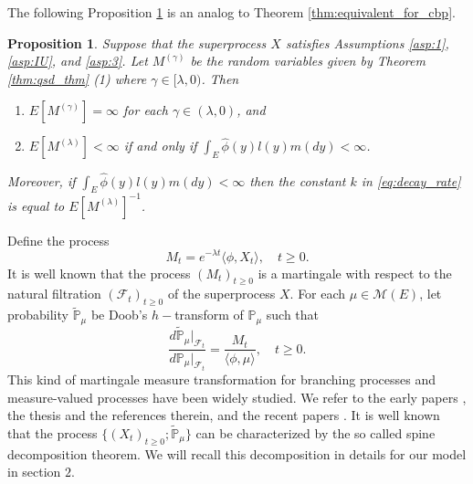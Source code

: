 \documentclass[12pt,a4paper]{amsart}
\numberwithin{equation}{section}
\theoremstyle{plain}
\newtheorem{prop}[thm]{Proposition}
\theoremstyle{definition}
\begin{document}
The following Proposition \ref{eq:exp_prop} is an analog to Theorem \ref{thm:equivalent_for_cbp}. 
\begin{prop}\label{eq:exp_prop}
	Suppose that the superprocess $X$ satisfies Assumptions \ref{asp:1},
  \ref{asp:IU}, and \ref{asp:3}.
	Let $M^{(\gamma)}$ be the random variables given by Theorem \ref{thm:qsd_thm} (1) where $\gamma \in [\lambda, 0)$.
  Then
  \begin{enumerate}
  \item
    $E[M^{(\gamma)}] = \infty$ for each $\gamma \in (\lambda, 0)$, and
  \item
    $E[M^{(\lambda)}] < \infty$ if and only if $\int_E \widehat\phi(y)l(y)m(dy)<\infty$.
  \end{enumerate}
  Moreover, if $\int_E \widehat\phi(y)l(y)m(dy)<\infty$ then the constant $k$ in \eqref{eq:decay_rate} is equal to $E[M^{(\lambda)}]^{-1}$.
\end{prop}
\begin{comment}
Recall the LlogL criteria of Theorem \ref{thm:equivalent_for_cbp}, we can say the above equivalency in proposition \ref{eq:exp_prop} is the same to that between items $(i)$ and $(iii)$ there.
\end{comment}
\par
Define the process
\[
	M_t=e^{-\lambda t}  \langle \phi, X_t\rangle, \quad t\geq 0.
\]
It is well known that the process  $(M_t)_{t\geq 0}$ is a martingale with respect to the natural filtration $(\mathscr F_t)_{t\geq 0}$ of the superprocess $X$.
For each $\mu \in \mathcal M(E)$, let probability $\widetilde{\mathbb P}_\mu$ be Doob's $h-$transform of $\mathbb P_\mu$ such that
\begin{equation} \label{eq:martingale_transformation}
	\frac{d\widetilde{\mathbb P}_\mu|_{\mathscr F_t}}{d\mathbb P_\mu|_{\mathscr F_t}}
	=\frac{M_t}{\langle\phi,\mu\rangle },
	\quad t\geq 0.
\end{equation}
This kind of martingale measure transformation for branching processes and measure-valued processes have been widely studied.
We refer to the early papers \cite{EnglanderKyprianou2004Local,Evans1993Two,RoellyRouault1989Processus}, the thesis \cite{Penisson2010Conditional} and the references therein, and the recent papers \cite{ChampagnatRoelly2008Limit,RenSongSun2019Spine,RenSongZhang2018Williams}.
It is well known that the process $\{(X_t)_{t\geq 0}; \widetilde{\mathbb P}_{\mu}\}$ can be characterized by the so called spine decomposition theorem.
We will recall this decomposition in details for our model in section $2$.
\end{document}
